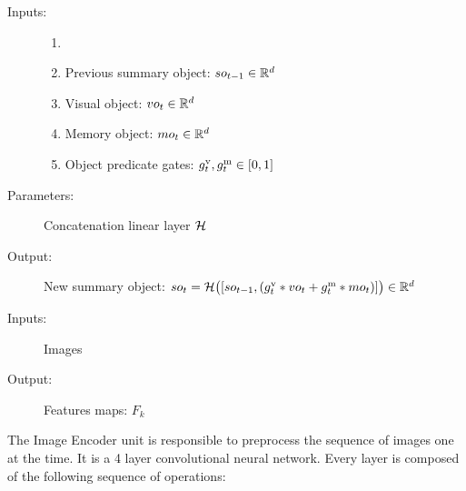 
%

\begin{description}
	\item[Inputs:] 
	\begin{enumerate}
		\item[]
		\item Previous summary object: $so_{t-1} \in \mathbb{R}^d$
		\item Visual object: $vo_t \in \mathbb{R}^d$
		\item Memory object: $mo_t \in \mathbb{R}^d$
		\item Object predicate gates: $g^{\mathrm{v}}_t, g^{\mathrm{m}}_t \in [0,1]$
	\end{enumerate}
	
	\item[Parameters:] Concatenation linear layer $\mathcal{H}$ 
	
	\item[Output:] 
	New summary object:
	$so_t = \mathcal{H}\bigl([so_{t-1}, (g^{\mathrm{v}}_t * vo_t + g^{\mathrm{m}}_t * mo_t)]\bigr) \in \mathbb{R}^d$ 
	
\end{description}


\noindent\makebox[\linewidth]{\rule{\paperwidth}{1pt}}






\begin{description}
	\item[Inputs:] 
	Images
	
	\item[Output:] 
	Features maps:
	$F_k$
\end{description}

The Image Encoder unit is responsible to preprocess the sequence of images one at the time. It is a 4 layer convolutional neural network. Every layer is composed of the following sequence of operations:


